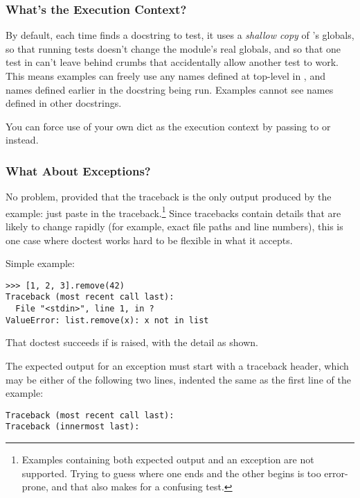 \subsubsection{What's the Execution Context?\label{doctest-execution-context}}

By default, each time  finds a docstring to test, it
uses a \emph{shallow copy} of 's globals, so that running tests
doesn't change the module's real globals, and so that one test in
 can't leave behind crumbs that accidentally allow another test
to work.  This means examples can freely use any names defined at top-level
in , and names defined earlier in the docstring being run.
Examples cannot see names defined in other docstrings.

You can force use of your own dict as the execution context by passing
 to  or
 instead.

\subsubsection{What About Exceptions?\label{doctest-exceptions}}

No problem, provided that the traceback is the only output produced by
the example:  just paste in the traceback.\footnote{Examples containing
    both expected output and an exception are not supported.  Trying
    to guess where one ends and the other begins is too error-prone,
    and that also makes for a confusing test.}
Since tracebacks contain details that are likely to change rapidly (for
example, exact file paths and line numbers), this is one case where doctest
works hard to be flexible in what it accepts.

Simple example:

\begin{verbatim}
>>> [1, 2, 3].remove(42)
Traceback (most recent call last):
  File "<stdin>", line 1, in ?
ValueError: list.remove(x): x not in list
\end{verbatim}

That doctest succeeds if  is raised, with the
 detail as shown.

The expected output for an exception must start with a traceback
header, which may be either of the following two lines, indented the
same as the first line of the example:

\begin{verbatim}
Traceback (most recent call last):
Traceback (innermost last):
\end{verbatim}

